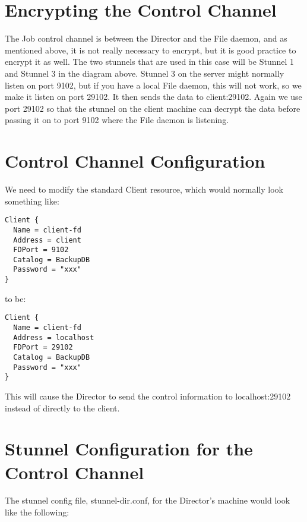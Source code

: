 \section{Encrypting the Control Channel}

The Job control channel is between the Director and the File daemon, and as
mentioned above, it is not really necessary to encrypt, but it is good
practice to encrypt it as well. The two stunnels that are used in this case
will be Stunnel 1 and Stunnel 3 in the diagram above. Stunnel 3 on the server
might normally listen on port 9102, but if you have a local File daemon, this
will not work, so we make it listen on port 29102. It then sends the data to
client:29102. Again we use port 29102 so that the stunnel on the client
machine can decrypt the data before passing it on to port 9102 where the File
daemon is listening. 

\section{Control Channel Configuration}

We need to modify the standard Client resource, which would normally look
something like: 

\footnotesize
\begin{verbatim}
Client {
  Name = client-fd
  Address = client
  FDPort = 9102
  Catalog = BackupDB
  Password = "xxx"
}
\end{verbatim}
\normalsize

to be: 

\footnotesize
\begin{verbatim}
Client {
  Name = client-fd
  Address = localhost
  FDPort = 29102
  Catalog = BackupDB
  Password = "xxx"
}
\end{verbatim}
\normalsize

This will cause the Director to send the control information to
localhost:29102 instead of directly to the client. 

\section{Stunnel Configuration for the Control Channel}

The stunnel config file, stunnel-dir.conf, for the Director's machine would
look like the following: 

